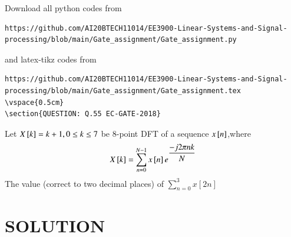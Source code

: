 \documentclass[journal,12pt,twocolumn]{IEEEtran}
\begin{document}
\maketitle
\newpage
\bigskip
\renewcommand{\thefigure}{\theenumi}
\renewcommand{\thetable}{\theenumi}
Download all python codes from 
\begin{lstlisting}
https://github.com/AI20BTECH11014/EE3900-Linear-Systems-and-Signal-processing/blob/main/Gate_assignment/Gate_assignment.py
\end{lstlisting}
%
and latex-tikz codes from 
%
\begin{lstlisting}
https://github.com/AI20BTECH11014/EE3900-Linear-Systems-and-Signal-processing/blob/main/Gate_assignment/Gate_assignment.tex
\vspace{0.5cm}
\section{QUESTION: Q.55 EC-GATE-2018}
\end{lstlisting}
  Let $X{}\left[k\right]= k +1, 0 \leq k \leq 7$ be 8-point DFT of a sequence $x{}\left[n\right]$,where$$X{}\left[k\right]= \sum_{n=0}^{N-1} x{}\left[n\right]e^{\dfrac{-j2\pi nk}{N}}$$
  The value (correct to two decimal places) of $\sum_{n=0}^{3} x[2n]$
\section{SOLUTION}
\end{document}
